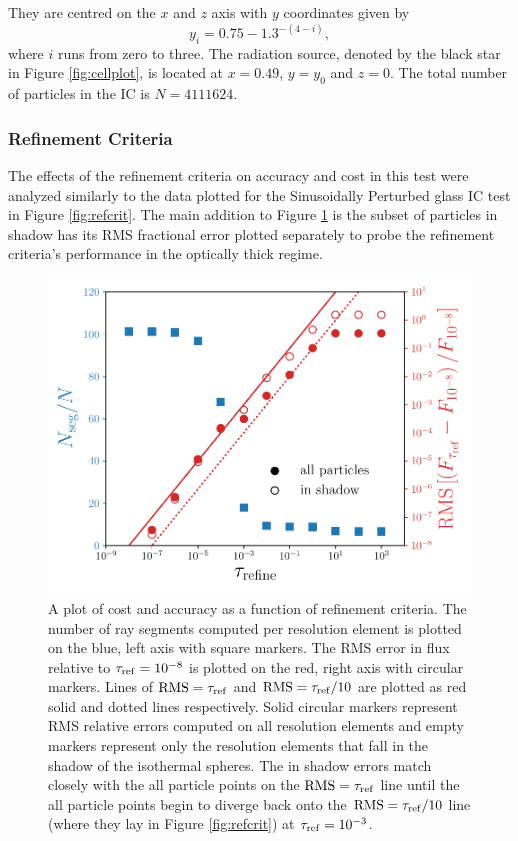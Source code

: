 \documentclass[fleq,usenatbib]{mnras}
\newcommand{\tr}{\tau_{\rm ref}}
\begin{document}
They are centred on the $x$ and $z$ axis with $y$ coordinates given by
\begin{equation}
y_i = 0.75 - 1.3^{-(4-i)},
\end{equation}
where $i$ runs from zero to three. The radiation source, denoted by the black 
star in Figure \ref{fig:cellplot}, is located at $x=0.49$, $y=y_0$ and $z=0$. 
The total number of particles in the IC is $N=4111624$.

\subsubsection{Refinement Criteria}
The effects of the refinement criteria on accuracy and cost in this test were 
analyzed similarly to the data plotted for the Sinusoidally Perturbed glass IC 
test in Figure \ref{fig:refcrit}. The main addition to Figure \ref{fig:isosph} 
is the subset of particles in shadow has its RMS fractional error plotted 
separately to probe the refinement criteria's performance in the optically 
thick regime.
\begin{figure}
\includegraphics[width=1\linewidth]{Figures/isothermal_spheres.pdf}
\caption{A plot of cost and accuracy as a function of refinement criteria. The 
number of ray segments computed per resolution element is plotted on the blue,
left axis with square markers. The RMS error in flux relative to $\tr
=10^{-8}$ is plotted on the red, right axis with circular markers. Lines of 
${\rm RMS} = \tr$ and ${\rm RMS} = \tr/10$ are plotted as red solid and dotted 
lines respectively. Solid circular markers represent RMS relative errors 
computed on all resolution elements and empty markers represent only the 
resolution elements that fall in the shadow of the isothermal spheres. The 
in shadow errors match closely with the all particle points on the ${\rm RMS} 
= \tr$ line until the all particle points begin to diverge back onto the 
${\rm RMS} = \tr/10$ line (where they lay in Figure \ref{fig:refcrit}) at 
$\tr=10^{-3}$.}
\label{fig:isosph}
\end{figure}
\end{document}
